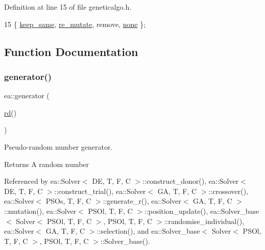 Definition at line 15 of file geneticalgo.\+h.


\begin{DoxyCode}
15 \{ \hyperlink{namespaceea_a8e369877773b4db67b8512efdb4f8f89ac4a301043ce8554dfced7a0c0698bdad}{keep\_same}, \hyperlink{namespaceea_a8e369877773b4db67b8512efdb4f8f89a49a303c9c8d8a0c15a7fc97cd4b1db0d}{re\_mutate}, \textcolor{keyword}{remove}, \hyperlink{namespaceea_a8e369877773b4db67b8512efdb4f8f89a334c4a4c42fdb79d7ebc3e73b517e6f8}{none} \};
\end{DoxyCode}


\subsection{Function Documentation}
\mbox{\label{namespaceea_a385e8ca8ba4ae2f69dcfffa79f20c2ff}} 
\subsubsection{\texorpdfstring{generator()}{generator()}}
{\footnotesize\ttfamily ea\+::generator (\begin{DoxyParamCaption}\item[{\hyperlink{namespaceea_a0d4adcfbf42f88a74097673d4564f757}{rd}()}]{ }\end{DoxyParamCaption})}



Pseudo-\/random number generator. 

\begin{DoxyReturn}{Returns}
A random number 
\end{DoxyReturn}


Referenced by ea\+::\+Solver$<$ D\+E, T, F, C $>$\+::construct\+\_\+donor(), ea\+::\+Solver$<$ D\+E, T, F, C $>$\+::construct\+\_\+trial(), ea\+::\+Solver$<$ G\+A, T, F, C $>$\+::crossover(), ea\+::\+Solver$<$ P\+S\+Os, T, F, C $>$\+::generate\+\_\+r(), ea\+::\+Solver$<$ G\+A, T, F, C $>$\+::mutation(), ea\+::\+Solver$<$ P\+S\+Ol, T, F, C $>$\+::position\+\_\+update(), ea\+::\+Solver\+\_\+base$<$ Solver$<$ P\+S\+Ol, T, F, C $>$, P\+S\+Ol, T, F, C $>$\+::randomise\+\_\+individual(), ea\+::\+Solver$<$ G\+A, T, F, C $>$\+::selection(), and ea\+::\+Solver\+\_\+base$<$ Solver$<$ P\+S\+Ol, T, F, C $>$, P\+S\+Ol, T, F, C $>$\+::\+Solver\+\_\+base().

